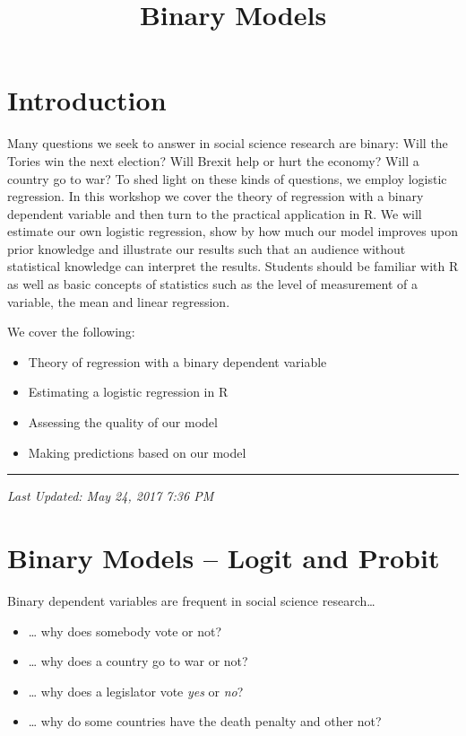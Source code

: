 \documentclass[]{article}
\title{Binary Models}
\author{}
\date{}
\providecommand{\tightlist}{%
  \setlength{\itemsep}{0pt}\setlength{\parskip}{0pt}}
\theoremstyle{definition}
\theoremstyle{definition}
\theoremstyle{remark}
\begin{document}
\maketitle

{
\setcounter{tocdepth}{2}
\tableofcontents
}
\section{Introduction}\label{introduction}

Many questions we seek to answer in social science research are binary:
Will the Tories win the next election? Will Brexit help or hurt the
economy? Will a country go to war? To shed light on these kinds of
questions, we employ logistic regression. In this workshop we cover the
theory of regression with a binary dependent variable and then turn to
the practical application in R. We will estimate our own logistic
regression, show by how much our model improves upon prior knowledge and
illustrate our results such that an audience without statistical
knowledge can interpret the results. Students should be familiar with R
as well as basic concepts of statistics such as the level of measurement
of a variable, the mean and linear regression.

We cover the following:

\begin{itemize}
\tightlist
\item
  Theory of regression with a binary dependent variable
\item
  Estimating a logistic regression in R
\item
  Assessing the quality of our model
\item
  Making predictions based on our model
\end{itemize}

\begin{center}\rule{0.5\linewidth}{\linethickness}\end{center}

\emph{Last Updated: May 24, 2017 7:36 PM}

\section{Binary Models -- Logit and
Probit}\label{binary-models-logit-and-probit}

Binary dependent variables are frequent in social science
research\ldots{}

\begin{itemize}
\tightlist
\item
  \ldots{} why does somebody vote or not?
\item
  \ldots{} why does a country go to war or not?
\item
  \ldots{} why does a legislator vote \emph{yes} or \emph{no}?
\item
  \ldots{} why do some countries have the death penalty and other not?
\end{itemize}
\end{document}

